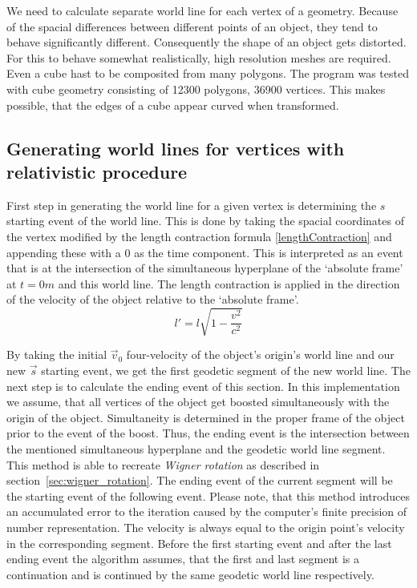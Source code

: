 \documentclass{egpubl}
\begin{document}
We need to calculate separate world line for each vertex of a geometry. Because of the spacial differences between different points of an object, they tend to behave significantly different. Consequently the shape of an object gets distorted. For this to behave somewhat realistically, high resolution meshes are required. Even a cube hast to be composited from many polygons. The program was tested with cube geometry consisting of 12300 polygons, 36900 vertices. This makes possible, that the edges of a cube appear curved when transformed.

\subsection{Generating world lines for vertices with relativistic procedure}
\label{sec:genRelProc}
First step in generating the world line for a given vertex is determining the $s$ starting event of the world line. This is done by taking the spacial coordinates of the vertex modified by the length contraction formula \ref{lengthContraction} and appending these with a $0$ as the time component. This is interpreted as an event that is at the intersection of the simultaneous hyperplane of the `absolute frame' at $t = 0 m$ and this world line. The length contraction is applied in the direction of the velocity of the object relative to the `absolute frame'.
\begin{equation}
\label{lengthContraction}
l' =l\sqrt{1 - \frac{v^2}{c^2}}
\end{equation}

By taking the initial $\vec{v}_0$ four-velocity of the object's origin's world line and our new $\vec{s}$ starting event, we get the first geodetic segment of the new world line. The next step is to calculate the ending event of this section. In this implementation we assume, that all vertices of the object get boosted simultaneously with the origin of the object. Simultaneity is determined in the proper frame of the object prior to the event of the boost. Thus, the ending event is the intersection between the mentioned simultaneous hyperplane and the geodetic world line segment. This method is able to recreate \emph{Wigner rotation} as described in section~\ref{sec:wigner_rotation}. The ending event of the current segment will be the starting event of the following event. Please note, that this method introduces an accumulated error to the iteration caused by the computer's finite precision of number representation. The velocity is always equal to the origin point's velocity in the corresponding segment. Before the first starting event and after the last ending event the algorithm assumes, that the first  and last segment is a continuation and is continued by the same geodetic world line respectively.
\end{document}
